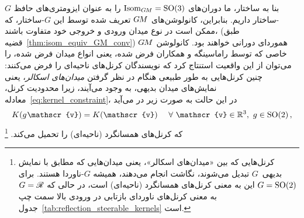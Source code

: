 بنا به ساختار، ما دوران‌های $\operatorname{Isom}_{G\mkern-1.4muM} = \operatorname{SO}(3)$ را به عنوان ایزومتری‌های حافظ $G$-ساختار داریم.
بنابراین، کانولوشن‌های $G\mkern-1.4muM$ تعریف شده توسط این $G$-ساختار، که ممکن است در نوع میدان ورودی و خروجی خود متفاوت باشند، (طبق قضیه~\ref{thm:isom_equiv_GM_conv}) هموردای دورانی خواهند بود.
کانولوشن $G\mkern-1.4muM$ خاصی که توسط راماسینگه و همکاران \cite{ramasinghe2019representation} فرض شده، یعنی انواع میدان فرض شده، را می‌توان از این واقعیت استنتاج کرد که نویسندگان کرنل‌های ناحیه‌ای را فرض می‌کنند:
چنین کرنل‌هایی به طور طبیعی هنگام در نظر گرفتن \emph{میدان‌های اسکالر}، یعنی نمایش‌های میدان بدیهی، به وجود می‌آیند، زیرا محدودیت کرنل، معادله~\eqref{eq:kernel_constraint}، در این حالت به صورت زیر در می‌آید
\begin{align}\label{eq:Euc3_punctured_SO2_constraint}
	K(g\mkern1mu \mathscr{v}) = K(\mathscr{v}) \quad\ \forall\ \mathscr{v}\in\R^3,\ g\in\SO2 \,,
\end{align}
که کرنل‌های همسانگرد (ناحیه‌ای) را تحمیل می‌کند.%
\footnote{
	کرنل‌هایی که بین «میدان‌های اسکالر»، یعنی میدان‌هایی که مطابق با نمایش بدیهی~$G$ تبدیل می‌شوند، نگاشت انجام می‌دهند، همیشه $G$-ناوردا هستند.
	برای $G=\operatorname{SO}(2)$ این به معنی کرنل‌های همسانگرد (ناحیه‌ای) است، در حالی که $G=\mathscr{R}$ به معنی کرنل‌های ناوردای بازتابی در ورودی بالا سمت چپ جدول~\ref{tab:reflection_steerable_kernels} است.
}


